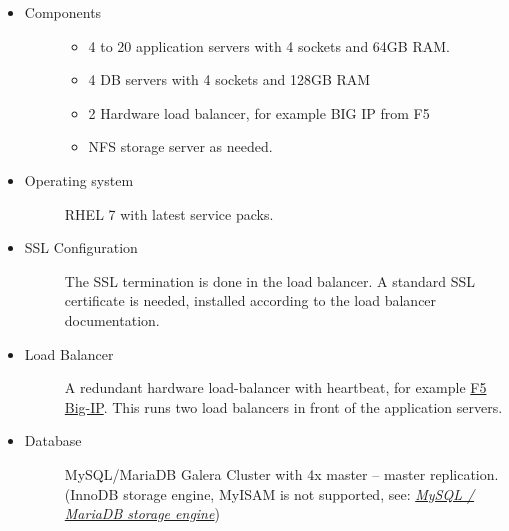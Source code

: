 \documentclass[letterpaper,10pt,english]{sphinxmanual}
\begin{document}
\begin{itemize}
\item {} \begin{description}
\item[{Components}] \leavevmode\begin{itemize}
\item {} 
4 to 20 application servers with 4 sockets and 64GB  RAM.

\item {} 
4 DB servers with 4 sockets and 128GB RAM

\item {} 
2 Hardware load balancer, for example BIG IP from F5

\item {} 
NFS storage server as needed.

\end{itemize}

\end{description}

\item {} \begin{description}
\item[{Operating system}] \leavevmode
RHEL 7 with latest service packs.

\end{description}

\item {} \begin{description}
\item[{SSL Configuration}] \leavevmode
The SSL termination is done in the load balancer. A standard SSL certificate
is needed, installed according to the load balancer documentation.

\end{description}

\item {} \begin{description}
\item[{Load Balancer}] \leavevmode
A redundant hardware load-balancer with heartbeat, for example \href{https://f5.com/products/big-ip/}{F5 Big-IP}.
This runs two load balancers in front of the application servers.

\end{description}

\item {} \begin{description}
\item[{Database}] \leavevmode
MySQL/MariaDB Galera Cluster with 4x master -- master replication. (InnoDB storage engine, MyISAM is not supported, see: {\hyperref[configuration_database/linux_database_configuration:db-storage-engine-label]{\emph{MySQL / MariaDB storage engine}}})


\end{description}
\end{itemize}
\end{document}
